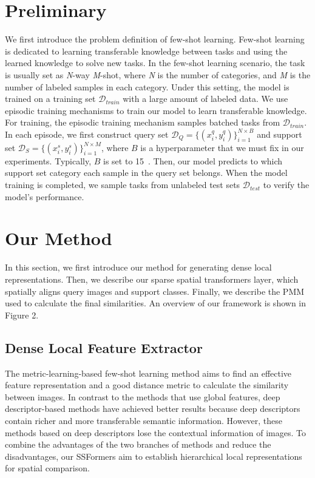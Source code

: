 \documentclass{SCIS2019}
\begin{document}
\section{Preliminary}
We first introduce the problem definition of few-shot learning.
Few-shot learning is dedicated to learning transferable knowledge between tasks and using the learned knowledge to solve new tasks. In the few-shot learning scenario, the task is usually set as \emph{N}-way \emph{M}-shot, where \emph{N} is the number of categories, and \emph{M} is the number of labeled samples in each category. Under this setting, the model is trained on a training set $\mathcal{D}_{train}$ with a large amount of labeled data. We use episodic training mechanisms to train our model to learn transferable knowledge. For training, the episodic training mechanism samples batched tasks from $\mathcal{D}_{train}$. In each episode, we first construct query set $\mathcal{D}_{Q}=\{ (x^q_i,y^q_i) \}_{i=1}^{N \times B}$ and support set $\mathcal{D}_S=\{ (x^s_i,y^s_i) \}_{i=1}^{N\times M}$, where $B$ is a hyperparameter that we must fix in our experiments. Typically, $B$ is set to 15~\cite{14,19}. Then, our model predicts to which support set category each sample in the query set belongs. When the model training is completed, we sample tasks from unlabeled test sets $\mathcal{D}_{test}$ to verify the model's performance.


\section{Our Method}
In this section, we first introduce our method for generating dense local representations. Then, we describe our sparse spatial transformers layer, which spatially aligns query images and support classes. Finally, we describe the PMM used to calculate the final similarities. An overview of our framework is shown in Figure 2.

\subsection{Dense Local Feature Extractor}
The metric-learning-based few-shot learning method aims to find an effective feature representation and a good distance metric to calculate the similarity between images. In contrast to the methods that use global features, deep descriptor-based methods have achieved better results because deep descriptors contain richer and more transferable semantic information. However, these methods based on deep descriptors lose the contextual information of images. To combine the advantages of the two branches of methods and reduce the disadvantages, our SSFormers aim to establish hierarchical local representations for spatial comparison. 
\end{document}
